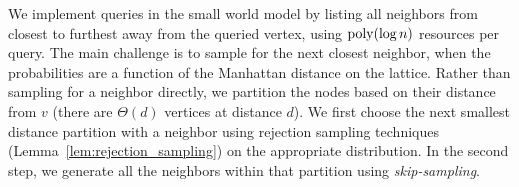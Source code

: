 We implement  queries in the small world model by listing all neighbors from closest to furthest away from the queried vertex,
using $\mathrm{poly}(\log n)$ resources per query.
The main challenge is to sample for the next closest neighbor, when the probabilities are a function of the Manhattan distance on the lattice.
Rather than sampling for a neighbor directly, we partition the nodes based on their distance from $v$ (there are $\Theta(d)$ vertices at distance $d$).
We first choose the next smallest distance partition with a neighbor using rejection sampling techniques
(Lemma~\ref{lem:rejection_sampling}) on the appropriate distribution.
In the second step, we generate all the neighbors within that partition using \emph{skip-sampling}.

